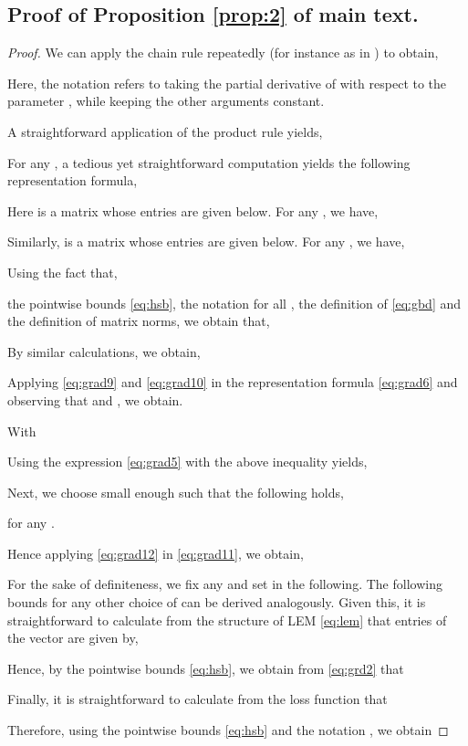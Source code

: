 \documentclass{article} \usepackage{iclr2022_conference,times}
\begin{document}
\subsection{Proof of Proposition \ref{prop:2} of main text.}
\label{app:hsgubpf}
\begin{proof}


We can apply the chain rule repeatedly (for instance as in \cite{vanish_grad}) to obtain,

Here, the notation  refers to taking the partial derivative of  with respect to the parameter , while keeping the other arguments constant.

A straightforward application of the product rule yields,

For any , a tedious yet straightforward computation yields the following representation formula,

Here  is a matrix whose entries are given below. For any , we have,

Similarly,  is a matrix whose entries are given below. For any , we have,

Using the fact that,

the pointwise bounds \eqref{eq:hsb}, the notation  for all , the definition of  \eqref{eq:gbd} and the definition of matrix norms, we obtain that,

By similar calculations, we obtain,

Applying \eqref{eq:grad9} and \eqref{eq:grad10} in the representation formula \eqref{eq:grad6} and observing that  and , we obtain.

With 


Using the expression \eqref{eq:grad5} with the above inequality yields,


Next, we choose  small enough such that the following holds, 

for any .

Hence applying \eqref{eq:grad12} in \eqref{eq:grad11}, we obtain,


For the sake of definiteness, we fix any  and set  in the following. The following bounds for any other choice of  can be derived analogously. Given this, it is straightforward to calculate from the structure of LEM \eqref{eq:lem} that entries of the vector  are given by,

Hence, by the pointwise bounds \eqref{eq:hsb}, we obtain from \eqref{eq:grd2} that


Finally, it is straightforward to calculate from the loss function  that

Therefore, using the pointwise bounds \eqref{eq:hsb} and the notation , we obtain



\end{proof}
\end{document}
